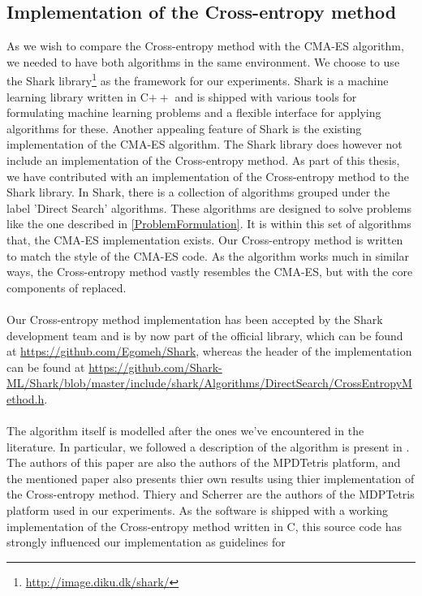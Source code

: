 \subsection{Implementation of the Cross-entropy method}

As we wish to compare the Cross-entropy method 
with the CMA-ES algorithm, we needed to have both algorithms
in the same environment. We choose to use the Shark 
library\footnote{\url{http://image.diku.dk/shark/}}
as the framework for our experiments. Shark is a machine 
learning library written in C$++$ and is shipped with various tools
for formulating machine learning problems and a flexible 
interface for applying algorithms for these. Another appealing
feature of Shark is the existing implementation of the CMA-ES algorithm.
The Shark library does however not include an implementation of
the Cross-entropy method. As part of this thesis, we have contributed with
an implementation of the Cross-entropy method to the Shark library.
In Shark, there is a collection of algorithms grouped under the label
'Direct Search' algorithms. These algorithms are designed to solve 
problems like the one described in \ref{ProblemFormulation}. It is within this set of algorithms that, 
the CMA-ES implementation exists. Our Cross-entropy method 
is written to match the style of the CMA-ES code. As the algorithm
works much in similar ways, the Cross-entropy method vastly resembles the CMA-ES, 
but with the core components of replaced.\\
\\
Our Cross-entropy method implementation has been accepted by the Shark development team and is 
by now part of the official library, which can be found at 
\url{https://github.com/Egomeh/Shark}, whereas the header of the 
implementation can be found at 
\url{https://github.com/Shark-ML/Shark/blob/master/include/shark/Algorithms/DirectSearch/CrossEntropyMethod.h}.\\
\\
The algorithm itself is modelled after the ones we've encountered 
in the literature. In particular, we followed a description of the algorithm is 
present in \citep{scherrer2009}. The authors of this paper are also the authors of the MPDTetris
platform, and the mentioned paper also presents thier own results using thier implementation of
the Cross-entropy method. 
Thiery and Scherrer are the authors of the 
MDPTetris platform used in our experiments.  As the 
software is shipped with a working implementation of the Cross-entropy method written in C,
this source code has strongly influenced our implementation as guidelines for
